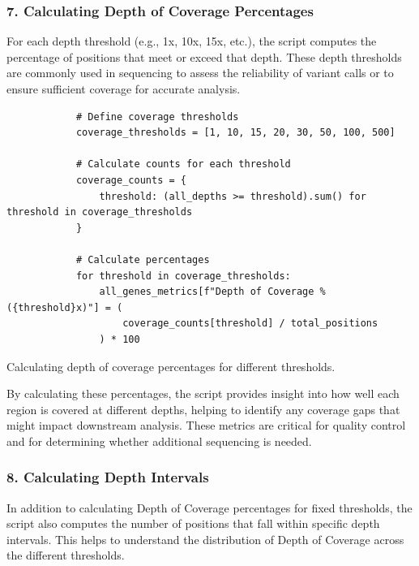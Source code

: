 \subsubsection{\textbf{7. Calculating Depth of Coverage Percentages}}

For each depth threshold (e.g., 1x, 10x, 15x, etc.), the script computes the percentage of positions that meet or exceed that depth. These depth thresholds are commonly used in sequencing to assess the reliability of variant calls or to ensure sufficient coverage for accurate analysis.

\begin{longlisting}
\begin{verbatim}
            # Define coverage thresholds
            coverage_thresholds = [1, 10, 15, 20, 30, 50, 100, 500]

            # Calculate counts for each threshold
            coverage_counts = {
                threshold: (all_depths >= threshold).sum() for threshold in coverage_thresholds
            }

            # Calculate percentages
            for threshold in coverage_thresholds:
                all_genes_metrics[f"Depth of Coverage % ({threshold}x)"] = (
                    coverage_counts[threshold] / total_positions
                ) * 100
\end{verbatim}
\caption{Calculating depth of coverage percentages for different thresholds.}
\label{lbl:metrics_coverage}
\end{longlisting}

By calculating these percentages, the script provides insight into how well each region is covered at different depths, helping to identify any coverage gaps that might impact downstream analysis. These metrics are critical for quality control and for determining whether additional sequencing is needed.

\subsubsection{\textbf{8. Calculating Depth Intervals}}

In addition to calculating Depth of Coverage percentages for fixed thresholds, the script also computes the number of positions that fall within specific depth intervals. This helps to understand the distribution of Depth of Coverage across the different thresholds.

